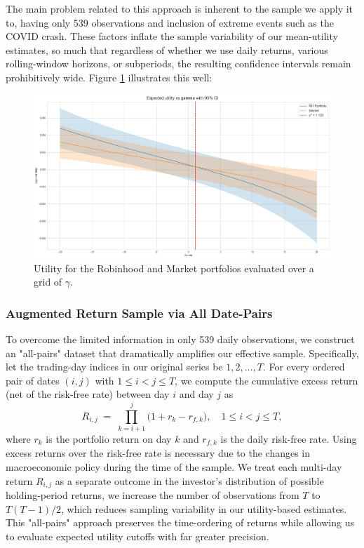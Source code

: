The main problem related to this approach is inherent to the sample we apply it to, having only 539 observations and inclusion of extreme events such as the COVID crash. 
These factors inflate the sample variability of our mean-utility estimates, so much that regardless of whether we use daily returns, various rolling-window horizons, or subperiods, the resulting confidence intervals remain prohibitively wide.
Figure \ref{fig:cutoff} illustrates this well: 
\begin{figure}[H]
    \centering
    \includegraphics[width=\linewidth]{../images/risk/cutoff_daily.png}
    \caption{Utility for the Robinhood and Market portfolios evaluated over a grid of $\gamma$.}
    \label{fig:cutoff}
\end{figure}

\subsubsection{Augmented Return Sample via All Date-Pairs}
\label{sec:allpairs}
To overcome the limited information in only 539 daily observations, we construct an "all-pairs" dataset that dramatically amplifies our effective sample.  
Specifically, let the trading-day indices in our original series be $1,2,\dots,T$.  
For every ordered pair of dates $(i,j)$ with $1 \le i < j \le T$, we compute the cumulative excess return (net of the risk-free rate) between day $i$ and day $j$ as
\begin{equation}
    R_{i,j}
    \;=\;
    \prod_{k=i+1}^{j}\bigl(1 + r_k - r_{f,k}\bigr),
    \quad
    1 \le i < j \le T,
    \label{eq:allpairs_return}
\end{equation}
where $r_k$ is the portfolio return on day $k$ and $r_{f,k}$ is the daily risk-free rate.  
Using excess returns over the risk-free rate is necessary due to the changes in macroeconomic policy during the time of the sample. 
We treat each multi-day return $R_{i,j}$ as a separate outcome in the investor's distribution of possible holding-period returns, we increase the number of observations from $T$ to $T(T-1)/2$, which reduces sampling variability in our utility-based estimates.  
This "all-pairs" approach preserves the time-ordering of returns while allowing us to evaluate expected utility cutoffs with far greater precision.  

